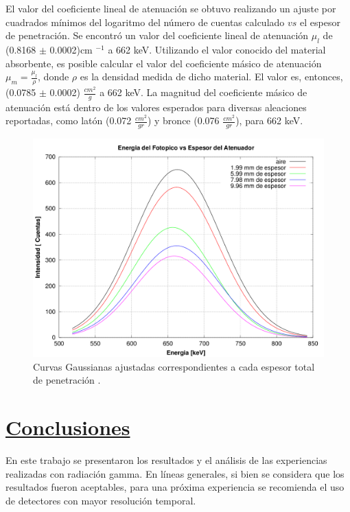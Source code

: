 \documentclass[twoside]{article}
\begin{document}
\begin{multicols}{2}
El valor del coeficiente lineal de atenuación se obtuvo realizando un ajuste por cuadrados mínimos del logaritmo del número de cuentas calculado $vs$ el espesor de penetración. Se encontró un valor del coeficiente lineal de atenuación ${\mu_l}$ de (0.8168 ${\pm}$ 0.0002)cm ${^{-1}}$ a 662 keV. Utilizando el valor conocido del material absorbente, es posible calcular el valor del coeficiente másico de atenuación ${\mu_m = \frac{\mu_l}{\rho}}$, donde ${\rho}$ es la densidad medida de dicho material. El valor es, entonces, (0.0785 ${\pm}$ 0.0002) ${\frac{cm^2}{g}}$ a 662 keV. La magnitud del coeficiente másico de atenuación está dentro de los valores esperados para diversas aleaciones reportadas\cite{bronce}, como latón (0.072 ${\frac{cm^2}{gr}}$) y bronce (0.076 ${\frac{cm^2}{gr}}$), para 662 keV.
 \begin{figure}[H]
    \centering
    \includegraphics[scale=0.35]{Curvas_Gaussianas_Ajustadas.png}
    \caption{Curvas Gaussianas ajustadas correspondientes a cada espesor total de penetración .}
    \label{ajuste_atenuacion}
\end{figure} 



\section*{\underline{Conclusiones}}
En este trabajo se presentaron los resultados y el análisis de las experiencias realizadas con radiación gamma. En líneas generales, si bien se considera que los resultados fueron aceptables, para una próxima experiencia se recomienda el uso de detectores con mayor resolución temporal.


\end{multicols}
\end{document}
